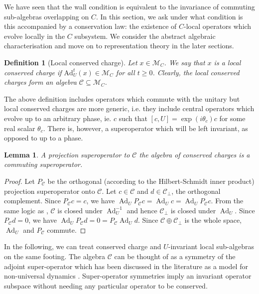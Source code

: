 \documentclass[11pt, twocolumn, floatfix, superscriptaddress, aps, prb, raggedbottom]{revtex4-2}
\newtheorem{lemma}[theorem]{Lemma}
\newtheorem{definition}{Definition}[section]
\DeclareMathOperator{\Ad}{Ad}
\begin{document}
 We have seen that the wall condition is equivalent to the invariance of commuting sub-algebras overlapping on $C$. In this section, we ask under what condition is this accompanied by a conservation law: the existence of $C$-local operators which evolve locally in the $C$ subsystem.  We consider the abstract algebraic characterisation and move on to representation theory in the later sections. 

\begin{definition}[Local conserved charge]
    Let $x\in \mathcal{M}_C$. We say that $x$ is a local conserved charge if $\mathrm{Ad}^t_U(x) \in \mathcal{M}_C$ for all $t\geq0$.
    Clearly, the local conserved charges form an algebra $\mathcal{C} \subseteq \mathcal{M}_C$.
\end{definition}

\noindent The above definition includes operators which commute with the unitary but local conserved charges are more generic, i.e. they include central operators which evolve up to an arbitrary phase, ie. $c$ such that $[c, U] = \exp(i\theta_c)c$ for some real scalar $\theta_c$. 
There is, however, a superoperator which will be left invariant, as opposed to up to a phase.

\begin{lemma}
    A projection superoperator to $\mathcal{C}$ the algebra of conserved charges is a commuting superoperator.
\end{lemma}
\begin{proof}
    Let $P_{\mathcal{C}}$ be the orthogonal (according to the Hilbert-Schmidt inner product) projection superoperator onto $\mathcal{C}$.
    Let $c \in \mathcal{C}$ and $d \in \mathcal{C}_\perp$, the orthogonal complement.
    Since $P_\mathcal{C} c = c$, we have $\Ad_U P_\mathcal{C} c = \Ad_U c = \Ad_U P_\mathcal{C} c$.
    From the same logic as , $\mathcal{C}$ is closed under $\Ad_U^{-1}$ and hence $\mathcal{C}_\perp$ is closed under $\Ad_U$.
    Since $P_\mathcal{C} d = 0$, we have $\Ad_U P_\mathcal{C} d = 0 = P_\mathcal{C} \Ad_U d$.
    Since $\mathcal{C} \oplus \mathcal{C}_\perp$ is the whole space, $\Ad_U$ and $P_\mathcal{C}$ commute.
\end{proof}
\noindent In the following, we can treat conserved charge and $U$-invariant local sub-algebras on the same footing. The algebra $\mathcal{C}$ can be thought of as a symmetry of the adjoint super-operator which has been discussed in the literature as a model for non-universal dynamics \cite{Lastres2026}. Super-operator symmetries imply an invariant operator subspace without needing any particular operator to be conserved.
\end{document}

